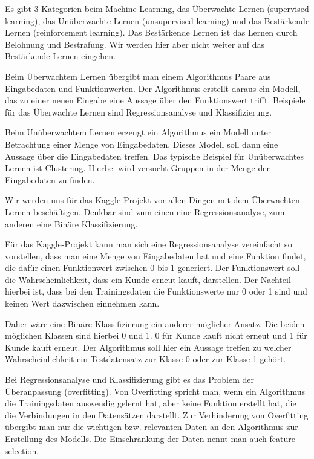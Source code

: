Es gibt 3 Kategorien beim Machine Learning, das Überwachte Lernen (supervised learning), das Unüberwachte Lernen (unsupervised learning) und das Bestärkende Lernen (reinforcement learning). Das Bestärkende Lernen ist das Lernen durch Belohnung und Bestrafung. Wir werden hier aber nicht weiter auf das Bestärkende Lernen eingehen.

Beim Überwachtem Lernen übergibt man einem Algorithmus Paare aus Eingabedaten und Funktionwerten. Der Algorithmus erstellt daraus ein Modell, das zu einer neuen Eingabe eine Aussage über den Funktionswert trifft. Beispiele für das Überwachte Lernen sind Regressionsanalyse und Klassifizierung.

Beim Unüberwachtem Lernen erzeugt ein Algorithmus ein Modell unter Betrachtung einer Menge von Eingabedaten. Dieses Modell soll dann eine Aussage über die Eingabedaten treffen. Das typische Beispiel für Unüberwachtes Lernen ist Clustering. Hierbei wird versucht Gruppen in der Menge der Eingabedaten zu finden.

Wir werden uns für das Kaggle-Projekt vor allen Dingen mit dem Überwachten Lernen beschäftigen. Denkbar sind zum einen eine Regressionsanalyse, zum anderen eine Binäre Klassifizierung.

Für das Kaggle-Projekt kann man sich eine Regressionsanalyse vereinfacht so vorstellen, dass man eine Menge von Eingabedaten hat und eine Funktion findet, die dafür einen Funktionwert zwischen 0 bis 1 generiert. Der Funktionswert soll die Wahrscheinlichkeit, dass ein Kunde erneut kauft, darstellen. Der Nachteil hierbei ist, dass bei den Trainingsdaten die Funktionswerte nur 0 oder 1 sind und keinen Wert dazwischen einnehmen kann.

Daher wäre eine Binäre Klassifizierung ein anderer möglicher Ansatz. Die beiden möglichen Klassen sind hierbei 0 und 1. 0 für Kunde kauft nicht erneut und 1 für Kunde kauft erneut. Der Algorithmus soll hier ein Aussage treffen zu welcher Wahrscheinlichkeit ein Testdatensatz zur Klasse 0 oder zur Klasse 1 gehört.

Bei Regressionsanalyse und Klassifizierung gibt es das Problem der Überanpassung (overfitting). Von Overfitting spricht man, wenn ein Algorithmus die Trainingsdaten auswendig gelernt hat, aber keine Funktion erstellt hat, die die Verbindungen in den Datensätzen darstellt. Zur Verhinderung von Overfitting übergibt man nur die wichtigen bzw. relevanten Daten an den Algorithmus zur Erstellung des Modells. Die Einschränkung der Daten nennt man auch feature selection.

